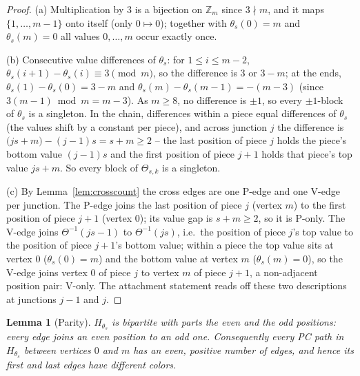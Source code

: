 \documentclass[11pt]{article}
\newtheorem{lemma}[theorem]{Lemma}
\theoremstyle{definition}
\newcommand{\inv}[1]{#1^{-1}}
\begin{document}
\begin{proof}
(a) Multiplication by $3$ is a bijection on $\mathbb Z_m$ since $3 \nmid m$, and it
maps $\{1, \dots, m-1\}$ onto itself (only $0 \mapsto 0$); together with
$\theta_s(0) = m$ and $\theta_s(m) = 0$ all values $0, \dots, m$ occur exactly once.

(b) Consecutive value differences of $\theta_s$: for $1 \le i \le m-2$,
$\theta_s(i+1) - \theta_s(i) \equiv 3 \pmod m$, so the difference is $3$ or $3 - m$;
at the ends, $\theta_s(1) - \theta_s(0) = 3 - m$ and
$\theta_s(m) - \theta_s(m-1) = -(m-3)$ (since $3(m-1) \bmod m = m - 3$). As
$m \ge 8$, no difference is $\pm1$, so every $\pm1$-block of $\theta_s$ is a
singleton. In the chain, differences within a piece equal differences of $\theta_s$
(the values shift by a constant per piece), and across junction $j$ the difference is
$\bigl(js + m\bigr) - (j-1)s = s + m \ge 2$ -- the last position of piece $j$ holds
the piece's bottom value $(j-1)s$ and the first position of piece $j+1$ holds that
piece's top value $js + m$. So every block of $\Theta_{s,k}$ is a singleton.

(c) By Lemma~\ref{lem:crosscount} the cross edges are one P-edge and one V-edge per
junction. The P-edge joins the last position of piece $j$ (vertex $m$) to the first
position of piece $j+1$ (vertex $0$); its value gap is $s + m \ge 2$, so it is P-only.
The V-edge joins $\inv\Theta(js - 1)$ to $\inv\Theta(js)$, i.e.\ the position of piece
$j$'s top value to the position of piece $j+1$'s bottom value; within a piece the top
value sits at vertex $0$ ($\theta_s(0) = m$) and the bottom value at vertex $m$
($\theta_s(m) = 0$), so the V-edge joins vertex $0$ of piece $j$ to vertex $m$ of
piece $j+1$, a non-adjacent position pair: V-only. The attachment statement reads off
these two descriptions at junctions $j-1$ and $j$.
\end{proof}

\begin{lemma}[Parity]\label{lem:stairparity}
$H_{\theta_s}$ is bipartite with parts the even and the odd positions: every edge
joins an even position to an odd one. Consequently every PC path in $H_{\theta_s}$
between vertices $0$ and $m$ has an even, positive number of edges, and hence its
first and last edges have \emph{different} colors.
\end{lemma}
\end{document}

